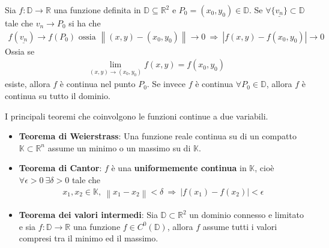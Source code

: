 \documentclass[a4paper, oneside]{book}
\begin{document}
\begin{definition}
    Sia $f : \mathbb{D} \to \mathbb{R}$ una funzione definita in $\mathbb{D} \subseteq \mathbb{R}^{2}$ e $P_0  =(x_0, y_0) \in \mathbb{D}$. Se
    $\forall \{\underline{v_n}\} \subset \mathbb{D}$ tale che $v_n \to P_0$ si ha che 
    \begin{gather*}
        f(\underline{v_n}) \to f(P_0) \text{ ossia } \left\lVert (x, y) - (x_0, y_0) \right\rVert \to  0 \ \Longrightarrow \ \left| f(x, y) - f(x_0, y_0) \right| \to 0
    \end{gather*}
    Ossia se 
    \begin{align}
        \lim_{(x, y) \to (x_0, y_0)} f(x, y ) = f(x_0, y_0) 
    \end{align}
    esiste, allora $f$ è continua nel punto $P_0$. Se invece $f$ è continua 
    $\forall P_0 \in \mathbb{D}$, allora $f$ è continua su tutto il dominio. 
\end{definition}
I principali teoremi che coinvolgono le funzioni continue a due variabili. 
\begin{itemize}
    \item \textbf{Teorema di Weierstrass}: Una funzione reale continua su di un compatto
    $\mathbb{K} \subset \mathbb {R}^{n}$ assume un minimo o un massimo su di $\mathbb{K}$.
    \item \textbf{Teorema di Cantor}: $f$ è una \textbf{uniformemente continua} in $\mathbb{K}$, cioè $\forall \epsilon > 0 \ \exists \delta > 0$ tale che
    \begin{align}
        x_1 , x_2 \in \mathbb{K}, \ \left\lVert x_1 - x_2 \right\rVert  < \delta \ \Longrightarrow \ \left| f(x_1) - f(x_2) \right|  < \epsilon
    \end{align}
    \item \textbf{Teorema dei valori intermedi}: Sia $\mathbb{D}\subset \mathbb{R}^{2}$ un dominio connesso e limitato
    e sia $f : \mathbb{D} \to \mathbb{R}$ una funzione $f \in C^{0}(\mathbb{D})$, allora $f$ assume tutti i valori 
    compresi tra il minimo ed il massimo.
\end{itemize}
\end{document}
